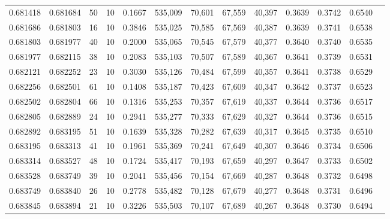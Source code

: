 \begin{tabular}{rrrrrrrrrrrrr}
0.681418 & 0.681684 &    50 &  10 &                                     0.1667 & 535,009 &  70,601 &  67,559 &  40,397 & 0.3639 & 0.3742 & 0.6540 \\
0.681686 & 0.681803 &    16 &  10 &                                     0.3846 & 535,025 &  70,585 &  67,569 &  40,387 & 0.3639 & 0.3741 & 0.6538 \\
0.681803 & 0.681977 &    40 &  10 &                                     0.2000 & 535,065 &  70,545 &  67,579 &  40,377 & 0.3640 & 0.3740 & 0.6535 \\
0.681977 & 0.682115 &    38 &  10 &                                     0.2083 & 535,103 &  70,507 &  67,589 &  40,367 & 0.3641 & 0.3739 & 0.6531 \\
0.682121 & 0.682252 &    23 &  10 &                                     0.3030 & 535,126 &  70,484 &  67,599 &  40,357 & 0.3641 & 0.3738 & 0.6529 \\
0.682256 & 0.682501 &    61 &  10 &                                     0.1408 & 535,187 &  70,423 &  67,609 &  40,347 & 0.3642 & 0.3737 & 0.6523 \\
0.682502 & 0.682804 &    66 &  10 &                                     0.1316 & 535,253 &  70,357 &  67,619 &  40,337 & 0.3644 & 0.3736 & 0.6517 \\
0.682805 & 0.682889 &    24 &  10 &                                     0.2941 & 535,277 &  70,333 &  67,629 &  40,327 & 0.3644 & 0.3736 & 0.6515 \\
0.682892 & 0.683195 &    51 &  10 &                                     0.1639 & 535,328 &  70,282 &  67,639 &  40,317 & 0.3645 & 0.3735 & 0.6510 \\
0.683195 & 0.683313 &    41 &  10 &                                     0.1961 & 535,369 &  70,241 &  67,649 &  40,307 & 0.3646 & 0.3734 & 0.6506 \\
0.683314 & 0.683527 &    48 &  10 &                                     0.1724 & 535,417 &  70,193 &  67,659 &  40,297 & 0.3647 & 0.3733 & 0.6502 \\
0.683528 & 0.683749 &    39 &  10 &                                     0.2041 & 535,456 &  70,154 &  67,669 &  40,287 & 0.3648 & 0.3732 & 0.6498 \\
0.683749 & 0.683840 &    26 &  10 &                                     0.2778 & 535,482 &  70,128 &  67,679 &  40,277 & 0.3648 & 0.3731 & 0.6496 \\
0.683845 & 0.683894 &    21 &  10 &                                     0.3226 & 535,503 &  70,107 &  67,689 &  40,267 & 0.3648 & 0.3730 & 0.6494 \\

\end{tabular}
